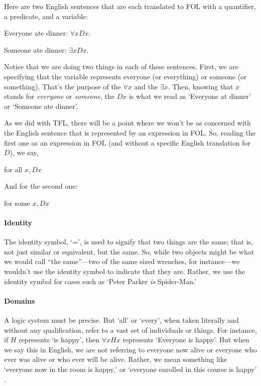 Here are two English sentences that are each translated to FOL with a quantifier, a predicate, and a variable:
\begin{ebullet}
	\item[] Everyone ate dinner: $\forall x Dx$. 
	\item[] Someone ate dinner: $\exists x Dx$.
\end{ebullet}
Notice that we are doing two things in each of these sentences. First, we are specifying that the variable represents everyone (or everything) or someone (or something). That's the purpose of the $\forall x$ and the $\exists x$. Then, knowing that $x$ stands for \textit{everyone} or \textit{someone}, the $Dx$ is what we read as `Everyone at dinner' or `Someone ate dinner'.

As we did with TFL, there will be a point where we won’t be as concerned with the English sentence that is represented by an expression in FOL. So, reading the first one as an expression in FOL (and without a specific English translation for $D$), we say, 

\centerline{for all $x, Dx$} 

\noindent And for the second one:

\centerline{for some $x, Dx$}


\paragraph{Identity}

The identity symbol, `=’, is used to signify that two things are the same; that is, not just similar or equivalent, but the same. So, while two objects might be what we would call ``the same''---two of the same sized wrenches, for instance---we wouldn't use the identity symbol to indicate that they are. Rather, we use the identity symbol for cases such as `Peter Parker \textit{is} Spider-Man.’ 


\paragraph{Domains}

A logic system must be precise. But `all’ or `every’, when taken literally and without any qualification, refer to a vast set of individuals or things. For instance, if $H$ represents `is happy’, then $\forall x Hx$ represents ‘Everyone is happy’. But when we say this in English, we are not referring to everyone now alive or everyone who ever was alive or who ever will be alive. Rather, we mean something like `everyone now in the room is happy,’ or `everyone enrolled in this course is happy’ {\libser \Large{}}.
 

